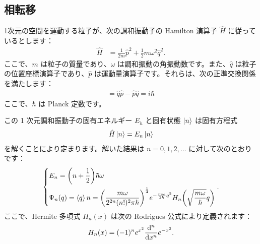 \documentclass[uplatex,dvipdfmx,a4paper,11pt]{jlreq}
\theoremstyle{definition}
\begin{document}
\subsection{相転移}

1次元の空間を運動する粒子が、次の調和振動子の Hamilton 演算子 $\hat{H}$ に従っているとします：
\begin{align}
  \hat{H} & = \frac{1}{2m}\hat{p}^2 + \frac{1}{2}m\omega^2\hat{q}^2.
\end{align}
ここで、$m$ は粒子の質量であり、$\omega$ は調和振動の角振動数です。また、$\hat{q}$ は粒子の位置座標演算子であり、$\hat{p}$ は運動量演算子です。それらは、次の正準交換関係を満たします：
\begin{align}
  [\hat{q}, \hat{p}] = \hat{q}\hat{p} - \hat{p}\hat{q} = i\hbar
\end{align}
ここで、$\hbar$ は Planck 定数です。

この 1 次元調和振動子の固有エネルギー $E_h$ と固有状態 $\ket{n}$ は固有方程式
\begin{align}
  \hat{H}\ket{n} = E_n\ket{n}
\end{align}
を解くことにより定まります。解いた結果は $n = 0, 1, 2, \ldots$ に対して次のとおりです：
\begin{align}
  \begin{dcases}
    E_n        = \qty(n + \frac{1}{2})\hbar\omega \\
    \Psi_n(q) = \braket{q}{n} = \qty(\frac{m\omega}{2^{2n}(n!)^2\pi\hbar})^{\frac{1}{4}}e^{-\frac{m\omega}{2\hbar}q^2}H_n\qty(\sqrt{\frac{m\omega}{\hbar}}q)
  \end{dcases}.
\end{align}
ここで、Hermite 多項式 $H_n(x)$ は次の Rodrigues 公式により定義されます：
\begin{align}
  H_n(x) = (-1)^ne^{x^2}\dv[n]{x}e^{-x^2}.
\end{align}
\end{document}
